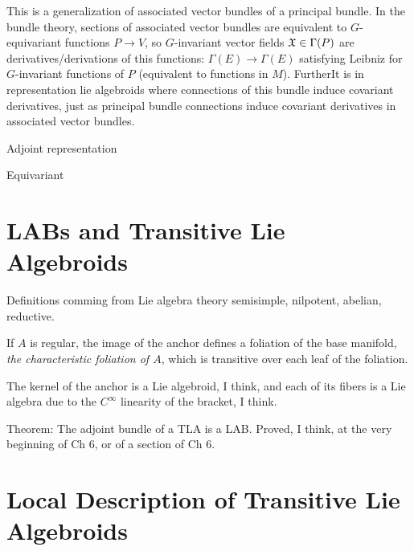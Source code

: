 This is a generalization of associated vector bundles of a principal bundle. In the bundle theory, sections of associated vector bundles are equivalent to $G$-equivariant functions $P \to V$, so $G$-invariant vector fields $\mathfrak{X} \in \Gamma(P)$ are derivatives/derivations of this functions: $\Gamma(E) \to \Gamma(E)$ satisfying Leibniz for $G$-invariant functions of $P$ (equivalent to functions in $M$). FurtherIt is in representation lie algebroids where connections of this bundle induce covariant derivatives, just as principal bundle connections induce covariant derivatives in associated vector bundles.

Adjoint representation

Equivariant

\section{LABs and Transitive Lie Algebroids}

Definitions comming from Lie algebra theory semisimple, nilpotent, abelian, reductive.

If $A$ is regular, the image of the anchor defines a foliation of the base manifold, \emph{the characteristic foliation of $A$}, which is transitive over each leaf of the foliation.

The kernel of the anchor is a Lie algebroid, I think, and each of its fibers is a Lie algebra due to the $C^\infty$ linearity of the bracket, I think. 

Theorem: The adjoint bundle of a TLA is a LAB. Proved, I think, at the very beginning of Ch 6, or of a section of Ch 6.

\section{Local Description of Transitive Lie Algebroids}

